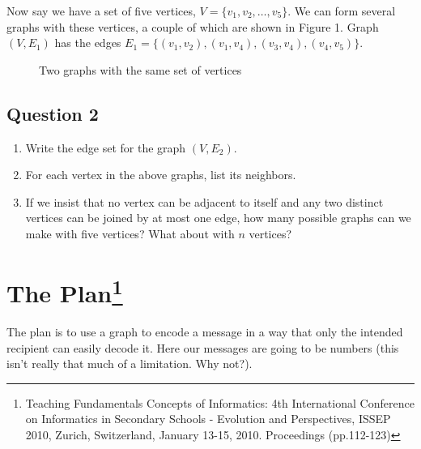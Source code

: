 \documentclass[12pt]{article}
\begin{document}
\noindent Now say we have a set of five vertices, $V = \{v_1, v_2, \ldots, v_5\}$. We can form several graphs with these vertices, a couple of which are shown in Figure 1. Graph $(V, E_1)$ has the edges $E_1 = \{(v_1, v_2), (v_1, v_4), (v_3, v_4), (v_4, v_5)\}$.
\begin{figure}
    \centering
    \qquad
    \caption{Two graphs with the same set of vertices}%
\end{figure}


\subsection*{Question 2}
\begin{enumerate}[a]
	\item Write the edge set for the graph $(V, E_2)$.
	\vspace{1cm}
	\item For each vertex in the above graphs, list its neighbors.
	\vspace{1cm}
	\item If we insist that no vertex can be adjacent to itself and any two distinct vertices can be joined by at most one edge, how many possible graphs can we make with five vertices? What about with $n$ vertices?
	\vspace{1cm}
\end{enumerate}

\section*{The Plan\footnote{Teaching Fundamentals Concepts of Informatics: 4th International Conference on Informatics in Secondary Schools - Evolution and Perspectives, ISSEP 2010, Zurich, Switzerland, January 13-15, 2010. Proceedings (pp.112-123)}}
The plan is to use a graph to encode a message in a way that only the intended recipient can easily decode it. Here our messages are going to be numbers (this isn't really that much of a limitation. Why not?).\\
\end{document}
